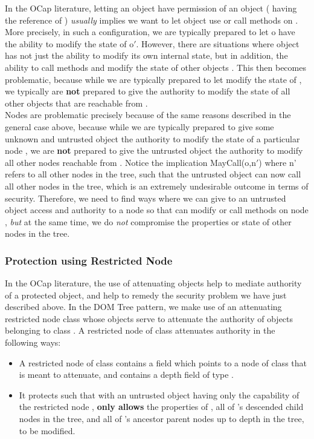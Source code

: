 \documentclass[a4paper,11pt,twoside]{article}
\begin{document}
In the OCap literature, letting an object  have permission of an object  ( having the reference of ) \textit{usually} implies we want to let object  use or call methods on . More precisely, in such a configuration, we are typically prepared to let o have the ability to modify the state of o$'$. However, there are situations where object  has not just the ability to modify its own internal state, but in addition, the ability to call methods  and modify the state of other objects . This then becomes problematic, because while we are typically prepared to let  modify the state of , we typically are \textbf{not} prepared to give  the authority to modify the state of all other objects  that are reachable from .\\

Nodes are problematic precisely because of the same reasons described in the general case above, because while we are typically prepared to give some unknown and untrusted object the authority to modify the state of a particular node , we are \textbf{not} prepared to give the untrusted object the authority to modify all other nodes reachable from . Notice the implication MayCall(o,n$'$) where n' refers to all other nodes in the tree, such that the untrusted object can now call all other nodes in the tree, which is an extremely undesirable outcome in terms of security. Therefore, we need to find ways where we can give to an untrusted object  access and authority to a node  so that  can modify or call methods on node , \textit{but} at the same time, we do \textit{not} compromise the properties or state of other nodes in the tree.

\subsubsection{Protection using Restricted Node}\label{domrenode}

In the OCap literature, the use of attenuating objects help to mediate authority of a protected object, and help to remedy the security problem we have just described above. In the DOM Tree pattern, we make use of an attenuating restricted node class  whose objects serve to attenuate the authority of objects belonging to class . A restricted node  of class  attenuates authority in the following ways:

\begin{itemize}
\item A restricted node  of class  contains a field which points to a node  of class  that  is meant to attenuate, and contains a depth field  of type . 
\item  It protects  such that with an untrusted object having only the capability of the restricted node ,  \textbf{only allows} the properties of , all of 's descended child nodes in the tree, and all of 's ancestor parent nodes up to depth  in the tree, to be modified.
\end{itemize}
\end{document}
